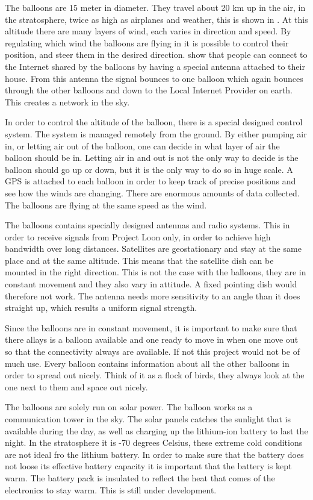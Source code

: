 The balloons are 15 meter in diameter. They travel about 20 km up in the air, in the stratosphere, twice as high as airplanes and weather, this is shown in . At this altitude there are many layers of wind, each varies in direction and speed. By regulating which wind the balloons are flying in it is possible to control their position, and steer them in the desired direction.  show that  people can connect to the Internet shared by the balloons by having a special antenna attached to their house. From this antenna the signal bounces to one balloon which again bounces through the other balloons and down to the Local Internet Provider on earth. This creates a network in the sky. 

In order to control the altitude of the balloon, there is a special designed control system. The system is managed remotely from the ground. By either pumping air in, or letting air out of the balloon, one can decide in what layer of air the balloon should be in. Letting air in and out is not the only way to decide is the balloon should go up or down, but it is the only way to do so in huge scale. A GPS is attached to each balloon in order to keep track of precise positions and see how the winds are changing. There are enormous amounts of data collected. The balloons are flying at the same speed as the wind.  

The balloons contains specially designed antennas and radio systems. This in order to receive signals from Project Loon only, in order to achieve high bandwidth over long distances. Satellites are geostationary and stay at the same place and at the same altitude. This means that the satellite dish can be mounted in the right direction. This is not the case with the balloons, they are in constant movement and they also vary in attitude. A fixed pointing dish would therefore not work. The antenna needs more sensitivity to an angle than it does straight up, which results a uniform signal strength. 

Since the balloons are in constant movement, it is important to make sure that there allays is a balloon available and one ready to move in when one move out so that the connectivity always are available. If not this project would not be of much use. Every balloon contains information about all the other balloons in order to spread out nicely. Think of it as a flock of birds, they always look at the one next to them and space out nicely.

The balloons are solely run on solar power. The balloon works as a communication tower in the sky. The solar panels catches the sunlight that is available during the day, as well as charging up the lithium-ion battery to last the night. In the stratosphere it is -70 degrees Celsius, these extreme cold conditions are not ideal fro the lithium battery. In order to make sure that the battery does not loose its effective battery capacity it is important that the battery is kept warm. The battery pack is insulated to reflect the heat that comes of the electronics to stay warm. This is still under development. 

